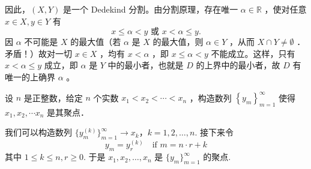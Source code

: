 因此，$(X, Y)$ 是一个 Dedekind 分割。由分割原理，存在唯一 $\alpha \in \mathbb{R}$ ，使对任意 $x \in X, y \in Y$ 有
\[
x \leqslant \alpha<y \text { 或 } x<\alpha \leqslant y .
\]
因 $\alpha$ 不可能是 $X$ 的最大值（若 $\alpha$ 是 $X$ 的最大值，则 $\alpha \in Y$ ，从而 $X \cap Y \neq \emptyset$ ．矛盾！）故对一切 $x \in X$ ，均有 $x<\alpha$ ，即 $x \leqslant \alpha<y$ 不能成立。这样，只有 $x<\alpha \leqslant y$ 成立，即 $\alpha$ 是 $Y$ 中的最小者，也就是 $D$ 的上界中的最小者，故 $D$ 有唯一的上确界 $\alpha$ 。

\begin{exercise}
设 $n$ 是正整数，给定 $n$ 个实数 $x_1<x_2<\cdots<x_n$ ，构造数列 $\left\{y_m\right\}_{m=1}^{\infty}$ 使得 $x_1, x_2, \cdots x_n$ 是其聚点．
\end{exercise}
我们可以构造数列 $\{ y^{(k)}_{m} \}_{m=1}^{\infty}\to x_k$，$k=1,2,\dots ,n$. 接下来令
\[
y_m=y^{(k)}_{r}\quad \text{if }m=n\cdot r+k
\]
其中 $1\leq k\leq n,r\geq0$. 于是 $x_1,x_2,\dots,x_n$ 是 $\{ y_m \}_{m=1}^{\infty}$ 的聚点.
